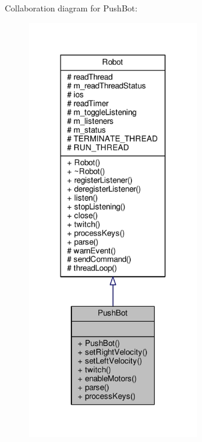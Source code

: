 Collaboration diagram for Push\+Bot\+:
\nopagebreak
\begin{figure}[H]
\begin{center}
\leavevmode
\includegraphics[width=211pt]{class_push_bot__coll__graph}
\end{center}
\end{figure}

